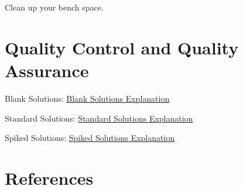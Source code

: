 \documentclass[12pt]{../SOP3_alpha}
\begin{document}
\NP Clean up your bench space.

\section{Quality Control and Quality Assurance}

\NP Blank Solutions: \href{https://en.wikipedia.org/wiki/Blank_(solution)}{Blank Solutions Explanation}

\NP Standard Solutions: \href{https://en.wikipedia.org/wiki/Standard_solution}{Standard Solutions Explanation}

\NP Spiked Solutions: \href{}{Spiked Solutions Explanation}



\section{References}


\end{document}
